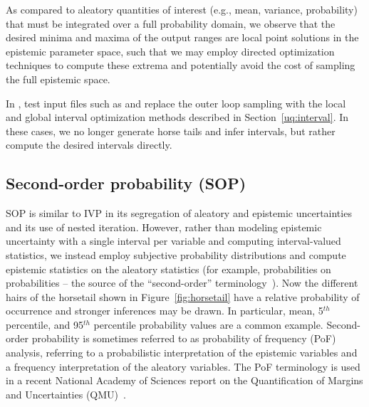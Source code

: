 As compared to aleatory quantities of interest (e.g., mean, variance,
probability) that must be integrated over a full probability domain,
we observe that the desired minima and maxima of the output ranges are
local point solutions in the epistemic parameter space, such that we
may employ directed optimization techniques to compute these extrema
and potentially avoid the cost of sampling the full epistemic space.

In , test input files such as
 and
 replace the outer loop
sampling with the local and global interval optimization methods
described in Section~\ref{uq:interval}. In these cases, we no longer
generate horse tails and infer intervals, but rather compute the
desired intervals directly.


\subsection{Second-order probability (SOP)} \label{adv_models:mixed_uq:sop}

SOP is similar to IVP in its segregation of aleatory and epistemic
uncertainties and its use of nested iteration. However, rather than
modeling epistemic uncertainty with a single interval per variable and
computing interval-valued statistics, we instead employ subjective
probability distributions and compute epistemic statistics on the
aleatory statistics (for example, probabilities on probabilities --
the source of the ``second-order'' terminology~\cite{GoNg99}). Now
the different hairs of the horsetail shown in
Figure~\ref{fig:horsetail} have a relative probability of occurrence
and stronger inferences may be drawn. In particular, mean, 5$^{th}$
percentile, and 95$^{th}$ percentile probability values are a common
example. Second-order probability is sometimes referred to as
probability of frequency (PoF) analysis, referring to a probabilistic
interpretation of the epistemic variables and a frequency
interpretation of the aleatory variables. The PoF terminology is used
in a recent National Academy of Sciences report on the Quantification
of Margins and Uncertainties (QMU)~\cite{NAS08}.

